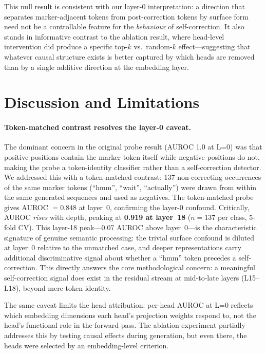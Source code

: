 \documentclass{article}
\begin{document}
This null result is consistent with our layer-0 interpretation: a direction that separates marker-adjacent tokens from post-correction tokens by surface form need not be a controllable feature for the \emph{behaviour} of self-correction.
It also stands in informative contrast to the ablation result, where head-level intervention did produce a specific top-$k$ vs.\ random-$k$ effect---suggesting that whatever causal structure exists is better captured by which heads are removed than by a single additive direction at the embedding layer.

\section{Discussion and Limitations}
\label{sec:discussion}

\paragraph{Token-matched contrast resolves the layer-0 caveat.}
The dominant concern in the original probe result (AUROC 1.0 at L=0) was that positive positions contain the marker token itself while negative positions do not, making the probe a token-identity classifier rather than a self-correction detector.
We addressed this with a token-matched contrast: 137 non-correcting occurrences of the same marker tokens (``hmm'', ``wait'', ``actually'') were drawn from within the same generated sequences and used as negatives.
The token-matched probe gives AUROC $= 0.848$ at layer~0, confirming the layer-0 confound.
Critically, AUROC \emph{rises} with depth, peaking at \textbf{0.919 at layer~18} ($n=137$ per class, 5-fold CV).
This layer-18 peak---0.07 AUROC above layer~0---is the characteristic signature of genuine semantic processing: the trivial surface confound is diluted at layer~0 relative to the unmatched case, and deeper representations carry additional discriminative signal about whether a ``hmm'' token precedes a self-correction.
This directly answers the core methodological concern: a meaningful self-correction signal does exist in the residual stream at mid-to-late layers (L15--L18), beyond mere token identity.

The same caveat limits the head attribution: per-head AUROC at L=0 reflects which embedding dimensions each head's projection weights respond to, not the head's functional role in the forward pass.
The ablation experiment partially addresses this by testing causal effects during generation, but even there, the heads were selected by an embedding-level criterion.
\end{document}
